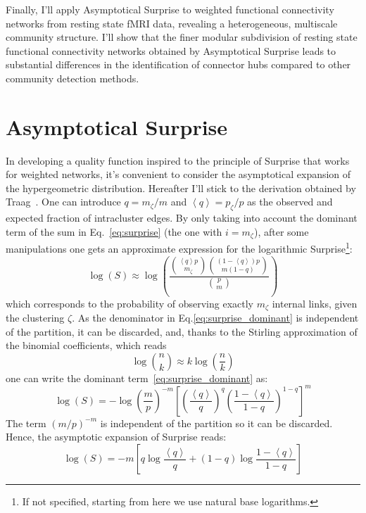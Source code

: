 Finally, I'll apply Asymptotical Surprise to weighted functional connectivity networks from resting state fMRI data, revealing a heterogeneous, multiscale community structure.
I'll show that the finer modular subdivision of resting state functional connectivity networks obtained by Asymptotical Surprise leads to substantial differences in the identification of connector hubs compared to other community detection methods.

\section{Asymptotical Surprise}
In developing a quality function inspired to the principle of Surprise that works for weighted networks, it's convenient to consider the asymptotical expansion of the hypergeometric distribution. Hereafter I'll stick to the derivation obtained by Traag~\cite{traag2015}.
One can introduce $q=m_\zeta/m$ and $\left<q \right>=p_\zeta/p$ as the observed and expected fraction of intracluster edges. By only taking into account the dominant term of the sum in Eq.~\ref{eq:surprise} (the one with $i=m_\zeta$), after some manipulations one gets an approximate expression for the logarithmic Surprise\footnote{If not specified, starting from here we use natural base logarithms.}:
\begin{equation}\label{eq:surprise_dominant}
\log(S) \approx \log \left( \frac{\binom{\left<q\right> p}{m_\zeta} \binom{(1-\left<q\right>)p}{m(1-q)}}{\binom{p}{m}} \right)
\end{equation}
which corresponds to the probability of observing exactly $m_\zeta$ internal links, given the clustering $\zeta$.
As the denominator in Eq.\ref{eq:surprise_dominant} is independent of the partition, it can be discarded, and, thanks to the Stirling approximation of the binomial coefficients, which reads 
\begin{equation}
\log \binom{n}{k} \approx k \log \left( \frac{n}{k} \right)
\end{equation}
one can write the dominant term~\ref{eq:surprise_dominant} as:
\begin{equation}
\log(S) = - \log \left(\frac{m}{p}\right)^{-m} \left[ \left(\frac{\left< q\right>}{q}\right)^q \left(\frac{1-\left< q\right>}{1-q}\right)^{1-q} \right]^{m}
\end{equation}
The term $(m/p)^{-m}$ is independent of the partition so it can be discarded.
Hence, the asymptotic expansion of Surprise reads:
\begin{equation}
\log(S) = -m \left[ q \log \frac{\left<q\right>}{q} + (1-q)\log \frac{1-\left<q\right>}{1-q} \right]
\end{equation}

